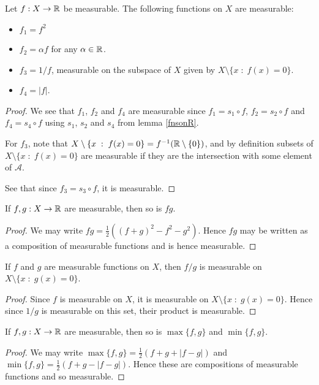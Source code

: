 \documentclass{unswmaths}
\begin{document}
\begin{corollary}
    Let $f:X\rightarrow\mathbb{R}$ be measurable. The following functions on $X$ are measurable:
    \begin{itemize}
        \item{} $f_1 = f^2$
        \item{} $f_2 = \alpha f$ for any $\alpha \in \mathbb{R}$.
        \item{} $f_3 = 1/f$, measurable on the subspace of $X$ given by $X\setminus\{x\;:\;f(x) = 0\}$.
        \item{} $f_4 = |f|$.
    \end{itemize}
\end{corollary}
\begin{proof}
    We see that $f_1$, $f_2$ and $f_4$ are measurable since $f_1 = s_1\circ f$, $f_2 = s_2 \circ f$
    and $f_4 = s_4\circ f$ using
    $s_1$, $s_2$ and $s_4$ from lemma \ref{fnsonR}.
    
    For $f_3$, note that $X\setminus\{x\;:\; f(x) = 0\} = f^{-1}(\mathbb{R}\setminus \{0\})$, and by definition
    subsets of $X\setminus \{x\;:\;f(x)=0\}$ are measurable if they are the intersection with some element
    of $\mathcal{A}$.
    
    See that since $f_3 = s_3 \circ f$, it is measurable.
\end{proof}

\begin{lemma}
    If $f,g:X\rightarrow\mathbb{R}$ are measurable, then so is $fg$.
\end{lemma}
\begin{proof}
    We may write $fg = \frac{1}{2}((f+g)^2-f^2-g^2)$. Hence $fg$ may be written as a composition of measurable functions
    and is hence measurable.
\end{proof}

\begin{corollary}
    If $f$ and $g$ are measurable functions on $X$, then $f/g$ is measurable on $X\setminus\{x\;:\;g(x) = 0\}$.
\end{corollary}
\begin{proof}
    Since $f$ is measurable on $X$, it is measurable on $X\setminus\{x\;:\;g(x)=0\}$. Hence since $1/g$ is measurable
    on this set, their product is measurable.
\end{proof}

\begin{lemma}
    If $f,g:X\rightarrow\mathbb{R}$ are measurable, then so is $\max\{f,g\}$ and $\min\{f,g\}$.
\end{lemma}
\begin{proof}
    We may write $\max\{f,g\} = \frac{1}{2}(f+g+|f-g|)$ and $\min\{f,g\} = \frac{1}{2}(f+g-|f-g|)$. Hence
    these are compositions of measurable functions and so measurable.
\end{proof}
\end{document}
